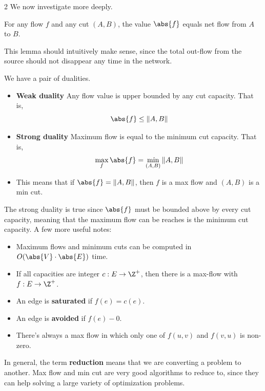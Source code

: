 \begin{multicols}{2}
We now investigate more deeply. 
\begin{lemma}
    For any flow $f$ and any cut $(A,B)$, the value $\abs{f}$ equals net flow from $A$ to $B$. 
\end{lemma}
This lemma should intuitively make sense, since the total out-flow from the source should not disappear any time in the network. 
\begin{prop}
    We have a pair of dualities. 
    \begin{itemize}
        \item \textbf{Weak duality} Any flow value is upper bounded by any cut capacity. That is, 
        $$
        \abs{f} \leq \|A,B\|
        $$
        \item \textbf{Strong duality} Maximum flow is equal to the minimum cut capacity. That is, 
        $$
        \max_f \abs{f} = \min_{(A,B)} \|A,B\|
        $$
        \item This means that if $\abs{f} = \|A, B\|$, then $f$ is a max flow and $(A,B)$ is a min cut. 
    \end{itemize}
\end{prop}
The strong duality is true since $\abs{f}$ must be bounded above by every cut capacity, meaning that the maximum flow can be reaches is the minimum cut capacity. A few more useful notes: 
\begin{itemize}
    \item Maximum flows and minimum cuts can be computed in $O(\abs{V}\cdot \abs{E})$ time. 
    \item If all capacities are integer $c : E \to \Z^+$, then there is a max-flow with $f: E \to \Z^+$. 
    \item An edge is \textbf{saturated} if $f(e) = c(e)$. 
    \item An edge is \textbf{avoided} if $f(e) - 0$. 
    \item There's always a max flow in which only one of $f(u,v)$ and $f(v,u)$ is non-zero. 
\end{itemize}

In general, the term \textbf{reduction} means that we are converting a problem to another. Max flow and min cut are very good algorithms to reduce to, since they can help solving a large variety of optimization problems. 


\end{multicols}
